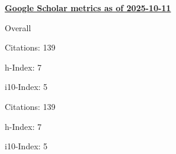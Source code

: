 \textbf{\href{https://scholar.google.it/citations?user=iJDPEaUAAAAJ&hl=it&oi=ao}{Google Scholar metrics as of 2025-10-11}}
\medskip
\centering
\begin{minipage}{.4\textwidth}
    \begin{outerlist}
        \item[] Overall
        \begin{innerlist}
            \item Citations: 139
            \item h-Index: 7
            \item i10-Index: 5
        \end{innerlist}
    \end{outerlist}
\end{minipage}
\hfill
\begin{minipage}{.4\textwidth}
    \begin{outerlist}
        \item[]
        \begin{innerlist}
            \item Citations: 139
            \item h-Index: 7
            \item i10-Index: 5
        \end{innerlist}
    \end{outerlist}
\end{minipage}
\vspace{1em}
